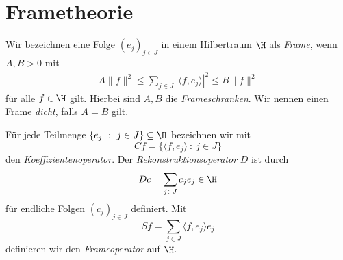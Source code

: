 \section{Frametheorie}

\begin{df}
	Wir bezeichnen eine Folge $ (e_j)_{j \in J} $ in einem Hilbertraum $ \H $ als \textit{Frame}, wenn
	$ A,B > 0  $ mit
	\begin{align}\label{eq:frame_definition}
	A \| f \|^2 \leq \sum \limits_{j \in J} | \langle f, e_j \rangle |^2 \leq B \|f \|^2
	\end{align}
	für alle $ f \in \H $ gilt. Hierbei sind $ A,B $ die \textit{Frameschranken}.
	Wir nennen einen Frame \textit{dicht}, falls $ A = B  $ gilt.
\end{df}

\begin{df}
	Für jede Teilmenge $ \lbrace e_j \ : \ j \in J \rbrace \subseteq \H $ bezeichnen wir mit
	\begin{equation}\label{coefficients_operator}
	Cf = \lbrace \langle f, e_j\rangle \ : \ j \in J \rbrace
	\end{equation}
	den \textit{Koeffizientenoperator}. Der \textit{Rekonstruktionsoperator} $ D $ ist durch
	\begin{equation}\label{reconstruction_operator}
	D c = \sum \limits_{j \in J} c_j e_j \in \H
	\end{equation}
	für endliche Folgen $ (c_j)_{j \in J} $ definiert. Mit
	\begin{equation}
	S f = \sum\limits_{j \in J} \langle f, e_j \rangle e_j
	\end{equation}
	definieren wir den \textit{Frameoperator} auf $ \H $.
\end{df}

